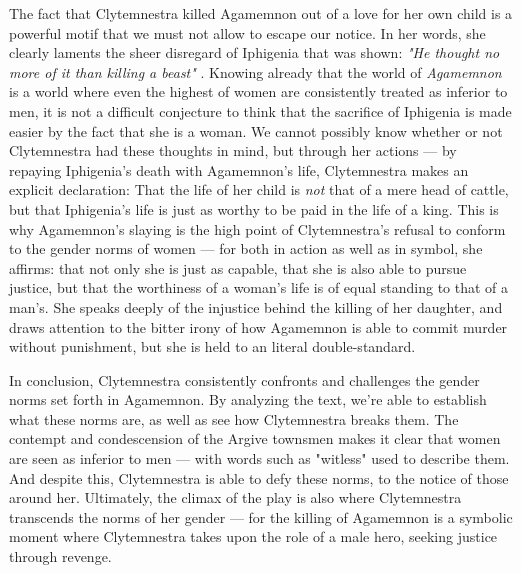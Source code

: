 \noindent
The fact that Clytemnestra killed Agamemnon out of a love for her own child is
a powerful motif that we must not allow to escape our notice. In her words, she
clearly laments the sheer disregard of Iphigenia that was shown: \emph{"He
thought no more of it than killing a beast"} \autocite[1440]{fagles}. Knowing
already that the world of \emph{Agamemnon} is a world where even the highest of
women are consistently treated as inferior to men, it is not a difficult
conjecture to think that the sacrifice of Iphigenia is made easier by the
fact that she is a woman. We cannot possibly know whether or not Clytemnestra
had these thoughts in mind, but through her actions --- by
repaying Iphigenia's death with Agamemnon's life, Clytemnestra makes an explicit
declaration: That the life of her child is \emph{not} that of a mere head of
cattle, but that Iphigenia's life is just as worthy to be paid in the life of a
king. This is why Agamemnon's slaying is the high point of Clytemnestra's
refusal to conform to the gender norms of women --- for both in action as well
as in symbol, she affirms: that not only she is just as capable, that she is
also able to pursue justice, but that the worthiness of a woman's life is of
equal standing to that of a man's. She speaks deeply of the injustice behind
the killing of her daughter, and draws attention to the bitter irony of how
Agamemnon is able to commit murder without punishment, but she is held to an
literal double-standard.

In conclusion, Clytemnestra consistently confronts and challenges the gender
norms set forth in Agamemnon. By analyzing the text, we're able to establish
what these norms are, as well as see how Clytemnestra breaks them. The contempt
and condescension of the Argive townsmen makes it clear that women are seen as
inferior to men --- with words such as "witless" used to describe them. And
despite this, Clytemnestra is able to defy these norms, to the notice of those
around her. Ultimately, the climax of the play is also where Clytemnestra
transcends the norms of her gender --- for the killing of Agamemnon is a
symbolic moment where Clytemnestra takes upon the role of a male hero,
seeking justice through revenge.

\noindent
